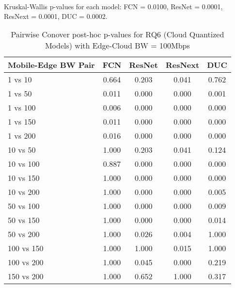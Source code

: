 \begin{table}[h]
\centering
\caption{Pairwise Conover post-hoc p-values for RQ6 (Cloud Quantized Models) with Edge-Cloud BW = 100Mbps}
\label{tab:conover_cloud_quantized_ec100}
\smallskip
Kruskal-Wallis p-values for each model: FCN = 0.0100, ResNet = 0.0001, ResNext = 0.0001, DUC = 0.0002.

\begin{tabular}{lcccc}
\toprule
Mobile-Edge BW Pair & FCN & ResNet & ResNext & DUC \\
\midrule
1 vs 10 & 0.664 & 0.203 & 0.041 & 0.762 \\
1 vs 50 & 0.011 & 0.000 & 0.000 & 0.001 \\
1 vs 100 & 0.006 & 0.000 & 0.000 & 0.000 \\
1 vs 150 & 0.011 & 0.000 & 0.000 & 0.000 \\
1 vs 200 & 0.016 & 0.000 & 0.000 & 0.000 \\
10 vs 50 & 1.000 & 0.203 & 0.041 & 0.124 \\
10 vs 100 & 0.887 & 0.000 & 0.000 & 0.000 \\
10 vs 150 & 1.000 & 0.000 & 0.000 & 0.000 \\
10 vs 200 & 1.000 & 0.000 & 0.000 & 0.005 \\
50 vs 100 & 1.000 & 0.000 & 0.000 & 0.009 \\
50 vs 150 & 1.000 & 0.000 & 0.000 & 0.014 \\
50 vs 200 & 1.000 & 0.026 & 0.004 & 1.000 \\
100 vs 150 & 1.000 & 1.000 & 0.015 & 1.000 \\
100 vs 200 & 1.000 & 0.045 & 0.000 & 0.219 \\
150 vs 200 & 1.000 & 0.652 & 1.000 & 0.317 \\
\bottomrule
\end{tabular}
\end{table}

